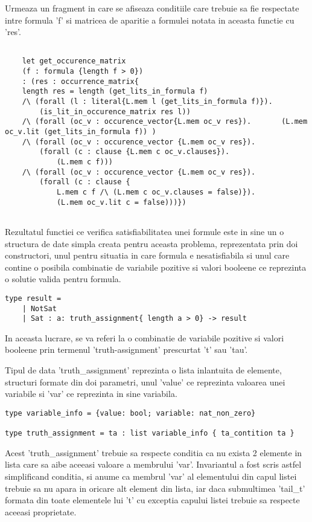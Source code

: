 Urmeaza un fragment in care se afiseaza conditiile care trebuie sa fie respectate intre formula 'f' si matricea de aparitie a formulei notata in aceasta functie cu 'res'.

\begin{lstlisting}[]
	
	let get_occurence_matrix 
	(f : formula {length f > 0}) 
	: (res : occurrence_matrix{
	length res = length (get_lits_in_formula f)
	/\ (forall (l : literal{L.mem l (get_lits_in_formula f)}). 
		(is_lit_in_occurence_matrix res l))
	/\ (forall (oc_v : occurence_vector{L.mem oc_v res}). 		(L.mem oc_v.lit (get_lits_in_formula f)) )
	/\ (forall (oc_v : occurence_vector {L.mem oc_v res}). 
		(forall (c : clause {L.mem c oc_v.clauses}). 
			(L.mem c f)))
	/\ (forall (oc_v : occurence_vector {L.mem oc_v res}). 
		(forall (c : clause {
			L.mem c f /\ (L.mem c oc_v.clauses = false)}). 
			(L.mem oc_v.lit c = false)))})
	
\end{lstlisting}

Rezultatul functiei ce verifica satisfiabilitatea unei formule este in sine un o structura de date simpla creata pentru aceasta problema, reprezentata prin doi constructori, unul pentru situatia in care formula e nesatisfiabila si unul care contine o posibila combinatie de variabile pozitive si valori booleene ce reprezinta o solutie valida pentru formula. 
\begin{lstlisting}[]
type result =
	| NotSat
	| Sat : a: truth_assignment{ length a > 0} -> result

\end{lstlisting}

In aceasta lucrare, se va referi la o combinatie de variabile pozitive si valori \newline booleene prin termenul 'truth-assignment' prescurtat 't' sau 'tau'.

Tipul de data 'truth\_assignment' reprezinta o lista inlantuita de elemente, structuri formate din doi parametri, unul 'value' ce reprezinta valoarea unei variabile si 'var' ce reprezinta in sine variabila.

\begin{lstlisting}[]
type variable_info = {value: bool; variable: nat_non_zero}

type truth_assignment = ta : list variable_info { ta_contition ta }
\end{lstlisting}

Acest 'truth\_assignment' trebuie sa respecte conditia ca nu exista 2 elemente in lista care sa aibe aceeasi valoare a membrului 'var'. Invariantul a fost scris astfel simplificand conditia, si anume ca membrul 'var' al elementului din capul listei trebuie sa nu apara in oricare alt element din lista, iar daca submultimea 'tail\_t' formata din toate elementele lui 't' cu exceptia capului listei trebuie sa respecte aceeasi proprietate.

